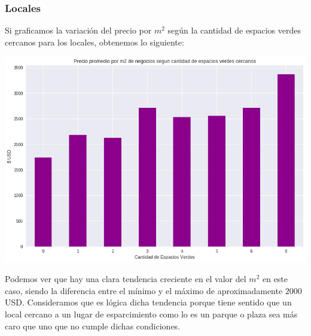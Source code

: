 \documentclass[a4paper, 10pt]{article}
\newcommand\tab[1][0.5cm]{\hspace*{#1}}
\begin{document}
			\subsubsection{Locales}
				Si graficamos la variación del precio por $m^2$ según la cantidad de espacios verdes cercanos para los locales,
				obtenemos lo siguiente:
				\begin{center}
					\includegraphics[width=\textwidth]{images/parksImpactStores}
				\end{center}
				\tab Podemos ver que hay una clara tendencia creciente en el valor del $m^2$ en este caso, siendo la diferencia entre
				el mínimo y el máximo de aproximadamente $2000$USD.
				\tab Consideramos que es lógica dicha tendencia porque tiene sentido que un local cercano a un lugar de esparcimiento 
				como lo es un parque o plaza sea más caro que uno que no cumple dichas condiciones.
\end{document}
